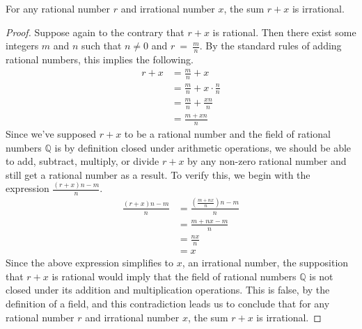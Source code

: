 \begin{proposition}
	For any rational number $r$ and irrational number $x$, the sum $r + x$ is irrational.
\end{proposition}
\begin{proof}
	Suppose again to the contrary that $r + x$ is rational. Then there exist some integers $m$ and $n$ such that $n \neq 0$ and $r~=~\frac{m}{n}$. By the standard rules of adding rational numbers, this implies the following.
	\begin{align*}
	r + x &= \frac{m}{n} + x \\
	&= \frac{m}{n} + x \cdot \frac{n}{n} \\
	&= \frac{m}{n} + \frac{xn}{n} \\
	&= \frac{m+xn}{n}
	\end{align*}
	Since we've supposed $r + x$ to be a rational number and the field of rational numbers $\mathbb{Q}$ is by definition closed under arithmetic operations, we should be able to add, subtract, multiply, or divide $r + x$ by any non-zero rational number and still get a rational number as a result. To verify this, we begin with the expression $\frac{\left( r + x \right) n - m}{n}$.
	\begin{align*}
	\frac{ \left( r + x \right) n - m }{n} &= \frac{ \left( \frac{ m + nx }{n} \right) n - m }{n} \\
	&= \frac{m + nx - m}{n} \\
	&= \frac{nx}{n} \\
	&= x
	\end{align*}
	Since the above expression simplifies to $x$, an irrational number, the supposition that $r + x$ is rational would imply that the field of rational numbers $\mathbb{Q}$ is not closed under its addition and multiplication operations. This is false, by the definition of a field, and this contradiction leads us to conclude that for any rational number $r$ and irrational number $x$, the sum $r + x$ is irrational.
\end{proof}
